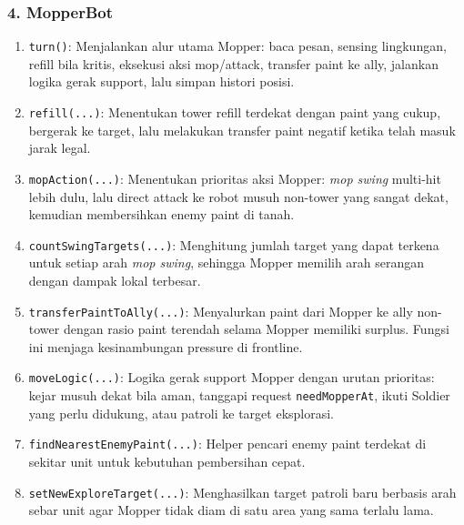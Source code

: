 \subsubsection{4. MopperBot}
\begin{enumerate}
	\item \texttt{turn()}:
	      Menjalankan alur utama Mopper: baca pesan, sensing lingkungan, refill bila kritis, eksekusi aksi mop/attack, transfer paint ke ally, jalankan logika gerak support, lalu simpan histori posisi.

	\item \texttt{refill(...)}:
	      Menentukan tower refill terdekat dengan paint yang cukup, bergerak ke target, lalu melakukan transfer paint negatif ketika telah masuk jarak legal.

	\item \texttt{mopAction(...)}:
	      Menentukan prioritas aksi Mopper: \textit{mop swing} multi-hit lebih dulu, lalu direct attack ke robot musuh non-tower yang sangat dekat, kemudian membersihkan enemy paint di tanah.

	\item \texttt{countSwingTargets(...)}:
	      Menghitung jumlah target yang dapat terkena untuk setiap arah \textit{mop swing}, sehingga Mopper memilih arah serangan dengan dampak lokal terbesar.

	\item \texttt{transferPaintToAlly(...)}:
	      Menyalurkan paint dari Mopper ke ally non-tower dengan rasio paint terendah selama Mopper memiliki surplus. Fungsi ini menjaga kesinambungan pressure di frontline.

	\item \texttt{moveLogic(...)}:
	      Logika gerak support Mopper dengan urutan prioritas: kejar musuh dekat bila aman, tanggapi request \texttt{needMopperAt}, ikuti Soldier yang perlu didukung, atau patroli ke target eksplorasi.

	\item \texttt{findNearestEnemyPaint(...)}:
	      Helper pencari enemy paint terdekat di sekitar unit untuk kebutuhan pembersihan cepat.

	\item \texttt{setNewExploreTarget(...)}:
	      Menghasilkan target patroli baru berbasis arah sebar unit agar Mopper tidak diam di satu area yang sama terlalu lama.
\end{enumerate}

